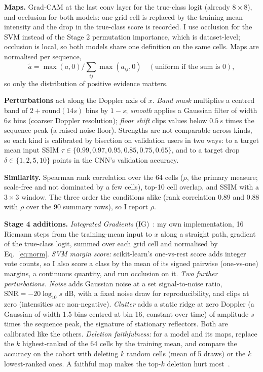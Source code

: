 \documentclass[11pt]{article}
\begin{document}
\textbf{Maps.} Grad-CAM at the last conv layer for the true-class logit (already $8\times8$), and occlusion for both models: one grid cell is replaced by the training mean intensity and the drop in the true-class score is recorded. I use occlusion for the SVM instead of the Stage 2 permutation importance, which is dataset-level; occlusion is local, so both models share one definition on the same cells. Maps are normalised per sequence,
\begin{equation}
\tilde a=\max(a,0)\Big/\textstyle\sum_{ij}\max(a_{ij},0)\quad(\text{uniform if the sum is }0),
\label{eq:norm}
\end{equation}
so only the distribution of positive evidence matters.

\textbf{Perturbations} act along the Doppler axis of $x$. \emph{Band mask} multiplies a centred band of $2+\mathrm{round}(14s)$ bins by $1-s$; \emph{smooth} applies a Gaussian filter of width $6s$ bins (coarser Doppler resolution); \emph{floor shift} clips values below $0.5\,s$ times the sequence peak (a raised noise floor). Strengths are not comparable across kinds, so each kind is calibrated by bisection on validation users in two ways: to a target mean input SSIM $\tau\in\{0.99,0.97,0.95,0.85,0.75,0.65\}$, and to a target drop $\delta\in\{1,2,5,10\}$ points in the CNN's validation accuracy.

\textbf{Similarity.} Spearman rank correlation over the 64 cells ($\rho$, the primary measure; scale-free and not dominated by a few cells), top-10 cell overlap, and SSIM with a $3\times3$ window. The three order the conditions alike (rank correlation 0.89 and 0.88 with $\rho$ over the 90 summary rows), so I report $\rho$.

\textbf{Stage 4 additions.} \emph{Integrated Gradients} (IG)~\citep{sundararajan2017ig}: my own implementation, 16 Riemann steps from the training-mean input to $x$ along a straight path, gradient of the true-class logit, summed over each grid cell and normalised by Eq.~\eqref{eq:norm}. \emph{SVM margin score:} scikit-learn's one-vs-rest score adds integer vote counts, so I also score a class by the mean of its signed pairwise (one-vs-one) margins, a continuous quantity, and run occlusion on it. \emph{Two further perturbations.} \emph{Noise} adds Gaussian noise at a set signal-to-noise ratio, $\mathrm{SNR}=-20\log_{10}s$ dB, with a fixed noise draw for reproducibility, and clips at zero (intensities are non-negative). \emph{Clutter} adds a static ridge at zero Doppler (a Gaussian of width 1.5 bins centred at bin 16, constant over time) of amplitude $s$ times the sequence peak, the signature of stationary reflectors. Both are calibrated like the others. \emph{Deletion faithfulness:} for a model and its maps, replace the $k$ highest-ranked of the 64 cells by the training mean, and compare the accuracy on the cohort with deleting $k$ random cells (mean of 5 draws) or the $k$ lowest-ranked ones. A faithful map makes the top-$k$ deletion hurt most~\citep{samek2017evaluating,petsiuk2018rise}.
\end{document}
